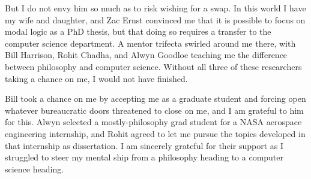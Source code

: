 But I do not envy him so much as to risk wishing for a swap. In this world I have my wife and daughter, and Zac Ernst convinced me that it is possible to focus on modal logic as a PhD thesis, but that doing so requires a transfer to the computer science department. A mentor trifecta swirled around me there, with Bill Harrison, Rohit Chadha, and Alwyn Goodloe teaching me the difference between philosophy and computer science. Without all three of these researchers taking a chance on me, I would not have finished.

Bill took a chance on me by accepting me as a graduate student and forcing open whatever bureaucratic doors threatened to close on me, and I am grateful to him for this. Alwyn selected a mostly-philosophy grad student for a NASA aerospace engineering internship, and Rohit agreed to let me pursue the topics developed in that internship as dissertation. I am sincerely grateful for their support as I struggled to steer my mental ship from a philosophy heading to a computer science heading.